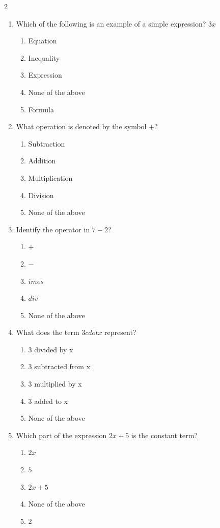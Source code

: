 \documentclass[10pt]{article}
\begin{document}
\begin{multicols}{2}
\begin{enumerate}[label=\textbf{Q\arabic*.}, leftmargin=*, itemsep=6pt, parsep=0pt]
  \item \small Which of the following is an example of a simple expression? $3x$
  \begin{enumerate}[label=(\Alph*), leftmargin=0.6cm, nosep, itemsep=2pt]
    \item Equation
    \item Inequality
    \item Expression
    \item None of the above
    \item Formula
  \end{enumerate}

  \item \small What operation is denoted by the symbol $+$?
  \begin{enumerate}[label=(\Alph*), leftmargin=0.6cm, nosep, itemsep=2pt]
    \item Subtraction
    \item Addition
    \item Multiplication
    \item Division
    \item None of the above
  \end{enumerate}

  \item \small Identify the operator in $7 - 2$?
  \begin{enumerate}[label=(\Alph*), leftmargin=0.6cm, nosep, itemsep=2pt]
    \item $+$
    \item $-$
    \item $	imes$
    \item $div$
    \item None of the above
  \end{enumerate}

  \item \small What does the term $3 cdot x$ represent?
  \begin{enumerate}[label=(\Alph*), leftmargin=0.6cm, nosep, itemsep=2pt]
    \item 3 divided by x
    \item 3 subtracted from x
    \item 3 multiplied by x
    \item 3 added to x
    \item None of the above
  \end{enumerate}

  \item \small Which part of the expression $2x + 5$ is the constant term?
  \begin{enumerate}[label=(\Alph*), leftmargin=0.6cm, nosep, itemsep=2pt]
    \item $2x$
    \item $5$
    \item $2x + 5$
    \item None of the above
    \item $2$
  \end{enumerate}

\end{enumerate}
\end{multicols}
\end{document}
